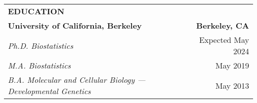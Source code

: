 \begin{center}
    \begin{tabularx}{\textwidth}{L R}
        {\large \textbf{EDUCATION}} & \\
        \textbf{University of California, Berkeley} & \textbf{Berkeley, CA} \\
        \small \textit{Ph.D. Biostatistics} & \small Expected May 2024 \\
        \small \textit{M.A. Biostatistics} & \small May 2019 \\
        \small \textit{B.A. Molecular and Cellular Biology --- Developmental Genetics} & \small May 2013 \\
    \end{tabularx}
\end{center}
